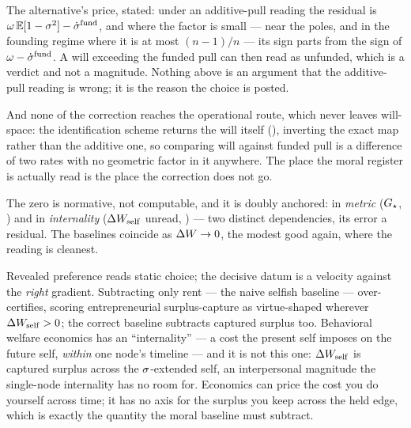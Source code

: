 \documentclass[../main]{subfiles}
\begin{document}
The alternative's price, stated: under an additive-pull reading the residual is
$\omega\,\mathbb E[1-\sigma^{2}]-\dot{\sigma}\sp{\mathrm{fund}}$, and where the factor is small ---
near the poles, and in the founding regime where it is at most $(n-1)/n$ --- its sign
parts from the sign of $\omega-\dot{\sigma}\sp{\mathrm{fund}}$. A will exceeding the funded pull can then
read as unfunded, which is a verdict and not a magnitude. Nothing above is an argument
that the additive-pull reading is wrong; it is the reason the choice is posted.

And none of the correction reaches the operational route, which never leaves
will-space: the identification scheme returns the will itself
(), inverting the exact map rather than the additive one, so
comparing will against funded pull is a difference of two rates with no geometric
factor in it anywhere. The place the moral register is actually read is the place the
correction does not go.

The zero is normative, not computable, and it is doubly anchored: in \emph{metric}
($G\sb{\star}$, ) and in \emph{internality}
($\Delta W\sb{\mathrm{self}}$ unread, ) --- two distinct dependencies, its error
a residual. The baselines coincide as $\Delta W\to0$, the modest good again, where the reading
is cleanest.

\begin{econ}[label=e:baseline, title={Subtracting the right gradient}, ref=op:vmoral,
  cites={a:samuelson,a:internality}, departs=scalar,
  stopsat={prices the cost you do yourself across time; has no axis for surplus kept across the held edge}]
  Revealed preference \parencite{a:samuelson} reads static choice; the decisive datum is a
  velocity against the \emph{right} gradient. Subtracting only rent --- the naive selfish
  baseline --- over-certifies, scoring entrepreneurial surplus-capture as virtue-shaped
  wherever $\Delta W\sb{\mathrm{self}}>0$; the correct baseline subtracts captured surplus too.
  Behavioral welfare economics has an ``internality'' \parencite{a:internality} --- a cost
  the present self imposes on the future self, \emph{within} one node's timeline --- and it is
  not this one: $\Delta W\sb{\mathrm{self}}$ is captured surplus across the $\sigma$-extended
  self, an interpersonal magnitude the single-node internality has no room for. Economics can
  price the cost you do yourself across time; it has no axis for the surplus you keep across
  the held edge, which is exactly the quantity the moral baseline must subtract.
\end{econ}
\end{document}

